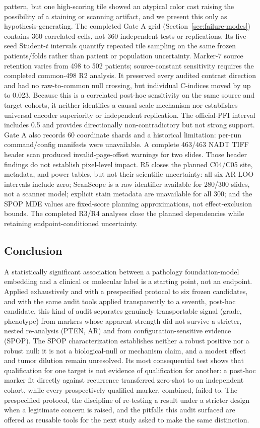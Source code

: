 pattern, but one high-scoring tile showed an atypical color cast raising the possibility of a
staining or scanning artifact, and we present this only as hypothesis-generating. The
completed Gate A grid (Section~\ref{sec:failure-modes}) contains 360 correlated cells, not 360
independent tests or replications. Its five-seed Student-$t$ intervals quantify repeated tile
sampling on the same frozen patients/folds rather than patient or population uncertainty.
Marker-7 source retention varies from 498 to 502 patients; source-constant sensitivity requires
the completed common-498 R2 analysis. It preserved every audited contrast direction and had no
raw-to-common null crossing, but individual C-indices moved by up to 0.023. Because this is a
correlated post-hoc sensitivity on the same source and target cohorts, it neither identifies a
causal scale mechanism nor establishes universal encoder superiority or independent
replication. The official-PFI interval includes 0.5 and provides directionally
non-contradictory but not strong support. Gate A also records 60 coordinate shards and a historical
limitation: per-run command/config manifests were unavailable. A complete 463/463 NADT TIFF
header scan produced invalid-page-offset warnings for two slides. Those header findings do not
establish pixel-level impact. R5 closes the planned C04/C05 site, metadata, and power tables,
but not their scientific uncertainty: all six AR LOO intervals include zero; ScanScope is a raw
identifier available for 280/300 slides, not a scanner model; explicit stain metadata are
unavailable for all 300; and the SPOP MDE values are fixed-score planning approximations, not
effect-exclusion bounds. The completed R3/R4 analyses close the planned dependencies while
retaining endpoint-conditioned uncertainty.

\subsection{Conclusion}

A statistically significant association between a pathology foundation-model embedding and a
clinical or molecular label is a starting point, not an endpoint. Applied exhaustively and with
a prespecified protocol to six frozen candidates, and with the same audit tools applied
transparently to a seventh, post-hoc candidate, this kind of audit separates genuinely
transportable signal (grade, phenotype) from markers whose apparent strength did not survive a
stricter, nested re-analysis (PTEN, AR) and from configuration-sensitive evidence (SPOP).
The SPOP characterization establishes neither a robust positive nor a robust null: it is not a
biological-null or mechanism claim, and a modest effect and tumor dilution remain unresolved.
Its most consequential test shows that qualification for one target is not evidence of
qualification for another: a post-hoc marker fit directly against recurrence transferred
zero-shot to an independent cohort, while every prospectively qualified marker, combined,
failed to. The prespecified protocol, the discipline of re-testing a result under a stricter
design when a legitimate concern is raised, and the pitfalls this audit surfaced are offered as
reusable tools for the next study asked to make the same distinction.
